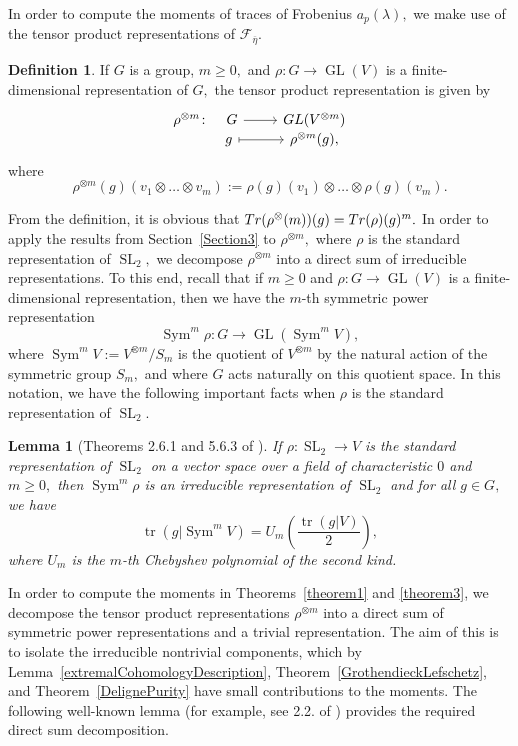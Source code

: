 \documentclass[12pt]{amsart}
\newtheorem{lemma}[theorem]{Lemma}
\theoremstyle{definition}
\newtheorem{definition}[theorem]{Definition}
\theoremstyle{remark}
\numberwithin{equation}{section}
\def\Tr{{\rm Tr}}
\DeclareMathOperator{\tr}{tr}
\DeclareMathOperator{\GL}{GL}
\DeclareMathOperator{\SL}{SL}
\DeclareMathOperator{\Sym}{Sym}
\begin{document}
In order to compute the moments of traces of Frobenius $a_p(\lambda),$ we make use of the tensor product representations of $\mathcal{F}_{\overline{\eta}}.$

\begin{definition}
    If $G$ is a group, $m\geq 0,$ and $\rho:G\to\GL(V)$ is a finite-dimensional representation of $G,$ the tensor product representation is given by
    $$
    \begin{tikzcd}[row sep=-4pt, column sep= normal]
     \rho^{\otimes m}\colon\!\ \ \ \ G \arrow[r] & GL(V^{\otimes m}) \\
    \ \ \ \ \ \ \ \quad g \arrow[r, maps to] & \rho^{\otimes m}(g),   
    \end{tikzcd}
    $$
    where
    $$
    \rho^{\otimes m}(g)(v_1\otimes\ldots\otimes v_m) := \rho(g)(v_1)\otimes\ldots\otimes\rho(g)(v_m).
    $$
\end{definition}
From the definition, it is obvious that $\Tr(\rho^{\otimes}(m))(g)=\Tr(\rho)(g)^m.$ In order to apply the results from Section~\ref{Section3} to $\rho^{\otimes m},$ where $\rho$ is the standard representation of $\SL_2,$ we decompose $\rho^{\otimes m}$ into a direct sum of irreducible representations.  To this end, recall that if $m\geq 0$ and $\rho:G\to\GL(V)$ is a finite-dimensional representation, then we have the $m$-th symmetric power representation
$$
\Sym^m\rho:G\to\GL(\Sym^mV),
$$
where $\Sym^m V:=V^{\otimes m}/S_m$ is the quotient of $V^{\otimes m}$ by the natural action of the symmetric group $S_m,$ and where $G$ acts naturally on this quotient space. In this notation, we have the following important facts when $\rho$ is the standard representation of $\SL_2.$

\begin{lemma}[Theorems 2.6.1 and 5.6.3 of \cite{KowalskiRep}]
    If $\rho:\SL_2\to V$ is the standard representation of $\SL_2$ on a vector space over a field of characteristic $0$ and $m\geq 0,$ then $\Sym^m\rho$ is an irreducible representation of $\SL_2$ and for all $g\in G,$ we have
    $$
    \tr(g|\Sym^m V) = U_m\left(\frac{\tr(g|V)}{2}\right),
    $$
    where $U_m$ is the $m$-th Chebyshev polynomial of the second kind.
\end{lemma}



In order to compute the moments in Theorems~\ref{theorem1} and \ref{theorem3}, we decompose the tensor product representations $\rho^{\otimes m}$ into a direct sum of symmetric power representations and a trivial representation. The aim of this is to isolate the irreducible nontrivial components, which by Lemma~\ref{extremalCohomologyDescription}, Theorem~\ref{GrothendieckLefschetz}, and Theorem~\ref{DelignePurity} have small contributions to the moments. The following well-known lemma (for example, see 2.2. of \cite{TemperleyLieb}) provides the required direct sum decomposition.
\end{document}
